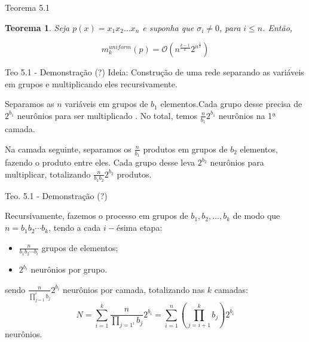 \documentclass{beamer}
\newtheorem{teo}{Teorema}[section]
\theoremstyle{definition}
\begin{document}
\begin{frame}{Teorema 5.1}
    \begin{teo}
        Seja $p(x) = x_1x_2 \dots x_n$ e suponha que $\sigma_i \neq 0$, para $i \leq n$. Então, 

        \begin{equation*}
            m_k^{uniform}(p) = \mathcal O(n^{\frac{k-1}{k}} 2^{n^{\frac 1 k}})
        \end{equation*}
    \end{teo}
\end{frame}

\begin{frame}{Teo 5.1 - Demonstração (?)}
    Ideia: Construção de uma rede separando as variáveis em grupos e multiplicando eles recursivamente. 

    \pause
    \vspace{1em}

    Separamos as $n$ variáveis em grupos de $b_1$ elementos.\pause Cada grupo desse precisa de $2^{b_1}$ neurônios para ser multiplicado \cite[Teorema 2]{Lin2017}. \pause 
    No total, temos $\frac{n}{b_1} 2^{b_1}$ neurônios na 1ª camada.
    
    \pause
    \vspace{1em}

    Na camada seguinte, separamos os $\frac{n}{b_1}$ produtos em grupos de $b_2$ elementos, fazendo o produto entre eles. Cada grupo desse leva $2^{b_2}$ neurônios para multiplicar, totalizando $\frac{n}{b_1b_2} 2^{b_2}$ produtos.

    \pause
    \vspace{1em}
\end{frame}

\begin{frame}{Teo. 5.1 - Demonstração (?)}

    Recursivamente, fazemos o processo em grupos de $b_1,b_2,\dots,b_k$ de modo que $n = b_1b_2 \cdots b_k$, tendo a cada $i-$ésima etapa: \pause
    \begin{itemize}
        \item $\frac{n}{b_1 b_2 \cdots b_i}$ grupos de elementos;
        \item $2^{b_i}$ neurônios por grupo.
    \end{itemize}
    \pause
    sendo $\frac{n}{\prod_{j=1}^i b_j} 2^{b_i}$ neurônios por camada, totalizando nas $k$ camadas: \pause
    \begin{equation*}
        N = \sum_{i=1}^k \frac{n}{\prod_{j=1^i} b_j} 2^{b_i} = \sum_{i=1}^n\left(\prod^k_{j=i+1} b_j \right) 2^{b_i}
    \end{equation*}
    neurônios.

\end{frame}
\end{document}
